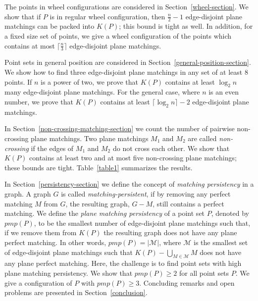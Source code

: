 \documentclass[11pt,a4paper]{article}
\newcommand{\Kn}[1]{K#1}
\newcommand{\pmp}[1]{pmp(#1)}
\begin{document}
The points in wheel configurations are considered in Section~\ref{wheel-section}. We show that if $P$ is in regular wheel configuration, then $\frac{n}{2}-1$ edge-disjoint plane matchings can be packed into $\Kn{(P)}$; this bound is tight as well. In addition, for a fixed size set of points, we give a wheel configuration of the points which contains at most $\lceil\frac{n}{3}\rceil$ edge-disjoint plane matchings. 

Point sets in general position are considered in Section~\ref{general-position-section}. We show how to find three edge-disjoint plane matchings in any set of at least 8 points. If $n$ is a power of two, we prove that $\Kn{(P)}$ contains at least $\log_2n$ many edge-disjoint plane matchings. For the general case, where $n$ is an even number, we prove that $\Kn{(P)}$ contains at least $\lceil\log_2n\rceil-2$ edge-disjoint plane matchings. 

In Section~\ref{non-crossing-matching-section} we count the number of pairwise non-crossing plane matchings. Two plane matchings $M_1$ and $M_2$ are called {\em non-crossing} if the edges of $M_1$ and $M_2$ do not cross each other. We show that $\Kn{(P)}$ contains at least two and at most five non-crossing plane matchings; these bounds are tight. Table~\ref{table1} summarizes the results. 

In Section~\ref{persistency-section} we define the concept of {\em matching persistency} in a graph. A graph $G$ is called {\em matching-persistent}, if by removing any perfect matching $M$ from $G$, the resulting graph, $G-M$, still contains a perfect matching. We define the {\em plane matching persistency} of a point set $P$, denoted by $\pmp{P}$, to be the smallest number of edge-disjoint plane matchings such that, if we remove them from $\Kn{(P)}$ the resulting graph does not have any plane perfect matching. In other words, $\pmp{P}=|\mathcal{M}|$, where $\mathcal{M}$ is the smallest set of edge-disjoint plane matchings such that $\Kn{(P)}-\bigcup_{M\in\mathcal{M}}{M}$ does not have any plane perfect matching. Here, the challenge is to find point sets with high plane matching persistency. We show that $\pmp{P}\ge 2$ for all point sets $P$. We give a configuration of $P$ with $\pmp{P}\ge 3$. 
Concluding remarks and open problems are presented in Section~\ref{conclusion}.
\end{document}
